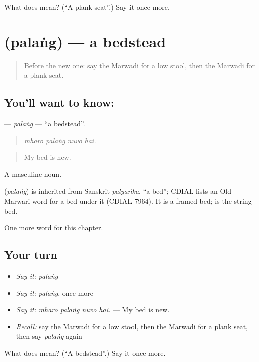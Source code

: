 \begin{tcolorbox}[breakable,colback=teal!4,colframe=teal!35!black,title={Before you move on}]
What does  mean? (\textquotedblleft{}A plank seat\textquotedblright{}.) Say it once more.
\end{tcolorbox}
\section[\texorpdfstring{\mw{पलंग} (palaṅg)}{पलंग (palaṅg)}]{ (palaṅg) — a bedstead}

\label{lesson:MW-C186-palang}



\begin{quote}
Before the new one: say the Marwadi for a low stool, then the Marwadi for a plank seat.
\end{quote}

\subsection*{You'll want to know: }
\textbf{} — \emph{palaṅg} — \textquotedblleft{}a bedstead\textquotedblright{}.

\begin{quote}
   
\end{quote}

\begin{quote}
\emph{mhāro palaṅg nuvo hai.}
\end{quote}

\begin{quote}
My bed is new.
\end{quote}

A masculine noun.

\begin{cousinweb}
\textbf{} (\emph{palaṅg}) is inherited from Sanskrit \emph{palyaṅka}, \textquotedblleft{}a bed\textquotedblright{}; CDIAL lists an Old Marwari word for a bed under it (CDIAL 7964). It is a framed bed; \textbf{} is the string bed.
\end{cousinweb}

\begin{grammarlens}[title={What you've built}]
One more word for this chapter.
\end{grammarlens}

\subsection*{Your turn}
\begin{itemize}
\raggedright
  \item \emph{Say it:} \emph{palaṅg}
  \item \emph{Say it:} \emph{palaṅg}, once more
  \item \emph{Say it:} \emph{mhāro palaṅg nuvo hai.} — My bed is new.
  \item \emph{Recall:} say the Marwadi for a low stool, then the Marwadi for a plank seat, then say \emph{palaṅg} again
\end{itemize}

\begin{tcolorbox}[breakable,colback=teal!4,colframe=teal!35!black,title={Before you move on}]
What does  mean? (\textquotedblleft{}A bedstead\textquotedblright{}.) Say it once more.
\end{tcolorbox}
